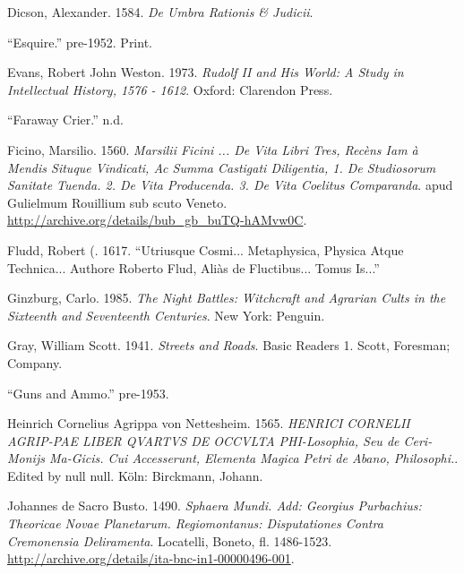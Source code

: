 \documentclass[
]{article}
\newlength{\cslhangindent}
\newenvironment{CSLReferences}[2] %
 {\begin{list}{}{%
  \setlength{\itemindent}{0pt}
  \setlength{\leftmargin}{0pt}
  \setlength{\parsep}{0pt}
  \ifodd #1
   \setlength{\leftmargin}{\cslhangindent}
   \setlength{\itemindent}{-1\cslhangindent}
  \fi
  \setlength{\itemsep}{#2\baselineskip}}}
 {\end{list}}
\begin{document}
\begin{CSLReferences}{1}{0}
Dicson, Alexander. 1584. \emph{De Umbra Rationis \& Judicii}.

{``Esquire.''} pre-1952. Print.

Evans, Robert John Weston. 1973. \emph{Rudolf II and His World: A Study
in Intellectual History, 1576 - 1612}. Oxford: Clarendon Press.

{``Faraway Crier.''} n.d.

Ficino, Marsilio. 1560. \emph{Marsilii {Ficini} ... {De} Vita Libri
Tres, Recèns Iam à Mendis Situque Vindicati, Ac Summa Castigati
Diligentia, 1. {De} Studiosorum Sanitate Tuenda. 2. {De} Vita
Producenda. 3. {De} Vita Coelitus Comparanda}. apud Gulielmum Rouillium
sub scuto Veneto. \url{http://archive.org/details/bub_gb_buTQ-hAMvw0C}.

Fludd, Robert (. 1617. {``Utriusque Cosmi... Metaphysica, Physica Atque
Technica... Authore Roberto Flud, Aliàs de Fluctibus... Tomus Is...''}

Ginzburg, Carlo. 1985. \emph{The Night Battles: Witchcraft and Agrarian
Cults in the Sixteenth and Seventeenth Centuries}. New York: Penguin.

Gray, William Scott. 1941. \emph{Streets and Roads}. Basic Readers 1.
Scott, Foresman; Company.

{``Guns and Ammo.''} pre-1953.

Heinrich Cornelius Agrippa von Nettesheim. 1565. \emph{HENRICI
\textbar\textbar{} CORNELII AGRIP-\textbar\textbar PAE LIBER QVARTVS
\textbar\textbar{} DE OCCVLTA PHI-\textbar\textbar Losophia, Seu de
Ceri-\textbar\textbar Monijs
Ma-\textbar\textbar Gicis.\textbar\textbar{} Cui Accesserunt, Elementa
\textbar\textbar{} Magica Petri de Abano,\textbar\textbar{}
Philosophi.\textbar\textbar{}}. Edited by null null. Köln: Birckmann,
Johann.

Johannes de Sacro Busto. 1490. \emph{Sphaera Mundi. {Add}: {Georgius}
{Purbachius}: {Theoricae} Novae Planetarum. {Regiomontanus}:
{Disputationes} Contra {Cremonensia} Deliramenta}. Locatelli, Boneto,
fl. 1486-1523.
\url{http://archive.org/details/ita-bnc-in1-00000496-001}.


\end{CSLReferences}
\end{document}
